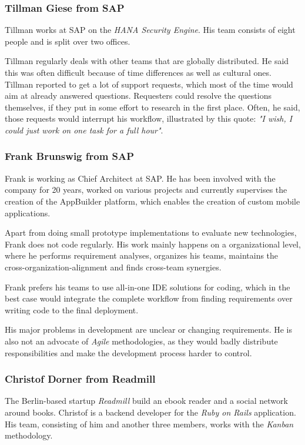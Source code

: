 \subsubsection{Tillman Giese from SAP}
Tillman works at SAP on the \emph{HANA Security Engine}. His team consists of eight people and is split over two offices.

Tillman regularly deals with other teams that are globally distributed. He said this was often difficult because of time differences as well as cultural ones. Tillman reported to get a lot of support requests, which most of the time would aim at already answered questions. Requesters could resolve the questions themselves, if they put in some effort to research in the first place. Often, he said, those requests would interrupt his workflow, illustrated by this quote: \emph{"I wish, I could just work on one task for a full hour"}.

\subsubsection{Frank Brunswig from SAP}
Frank is working as Chief Architect at SAP. He has been involved with the company for 20 years, worked on various projects and currently supervises the creation of the AppBuilder platform, which enables the creation of custom mobile applications.

Apart from doing small prototype implementations to evaluate new technologies, Frank does not code regularly. His work mainly happens on a organizational level, where he performs requirement analyses, organizes his teams, maintains the cross-organization-alignment and finds cross-team synergies.

Frank prefers his teams to use all-in-one IDE solutions for coding, which in the best case would integrate the complete workflow from finding requirements over writing code to the final deployment.

His major problems in development are unclear or changing requirements. He is also not an advocate of \emph{Agile} methodologies, as they would badly distribute responsibilities and make the development process harder to control.

\subsubsection{Christof Dorner from Readmill}
The Berlin-based startup \emph{Readmill} build an ebook reader and a social network around books. Christof is a backend developer for the \emph{Ruby on Rails} application. His team, consisting of him and another three members,  works with the \emph{Kanban} methodology.

